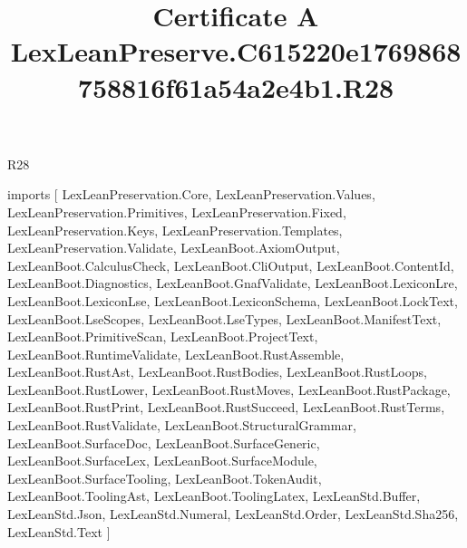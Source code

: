 \begin{lexlean}{R28}
\title{Certificate A LexLeanPreserve.C615220e1769868758816f61a54a2e4b1.R28}
\begin{coremodule}
imports [
  LexLeanPreservation.Core,
  LexLeanPreservation.Values,
  LexLeanPreservation.Primitives,
  LexLeanPreservation.Fixed,
  LexLeanPreservation.Keys,
  LexLeanPreservation.Templates,
  LexLeanPreservation.Validate,
  LexLeanBoot.AxiomOutput,
  LexLeanBoot.CalculusCheck,
  LexLeanBoot.CliOutput,
  LexLeanBoot.ContentId,
  LexLeanBoot.Diagnostics,
  LexLeanBoot.GnafValidate,
  LexLeanBoot.LexiconLre,
  LexLeanBoot.LexiconLse,
  LexLeanBoot.LexiconSchema,
  LexLeanBoot.LockText,
  LexLeanBoot.LseScopes,
  LexLeanBoot.LseTypes,
  LexLeanBoot.ManifestText,
  LexLeanBoot.PrimitiveScan,
  LexLeanBoot.ProjectText,
  LexLeanBoot.RuntimeValidate,
  LexLeanBoot.RustAssemble,
  LexLeanBoot.RustAst,
  LexLeanBoot.RustBodies,
  LexLeanBoot.RustLoops,
  LexLeanBoot.RustLower,
  LexLeanBoot.RustMoves,
  LexLeanBoot.RustPackage,
  LexLeanBoot.RustPrint,
  LexLeanBoot.RustSucceed,
  LexLeanBoot.RustTerms,
  LexLeanBoot.RustValidate,
  LexLeanBoot.StructuralGrammar,
  LexLeanBoot.SurfaceDoc,
  LexLeanBoot.SurfaceGeneric,
  LexLeanBoot.SurfaceLex,
  LexLeanBoot.SurfaceModule,
  LexLeanBoot.SurfaceTooling,
  LexLeanBoot.TokenAudit,
  LexLeanBoot.ToolingAst,
  LexLeanBoot.ToolingLatex,
  LexLeanStd.Buffer,
  LexLeanStd.Json,
  LexLeanStd.Numeral,
  LexLeanStd.Order,
  LexLeanStd.Sha256,
  LexLeanStd.Text
]


\end{coremodule}
\end{lexlean}
